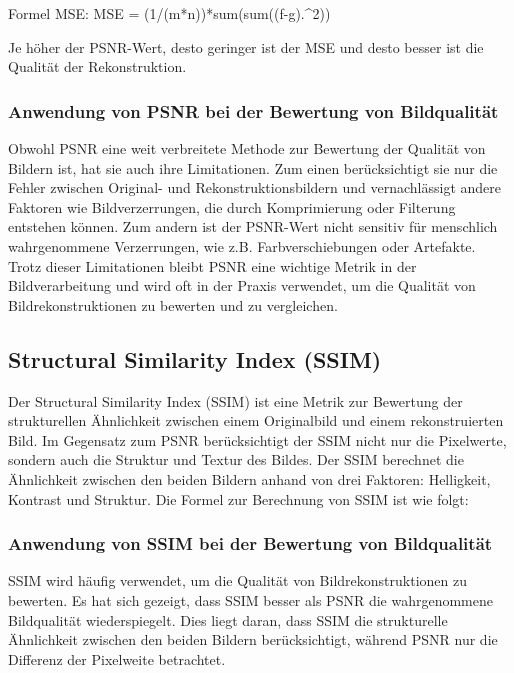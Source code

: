             Formel MSE: MSE = (1/(m*n))*sum(sum((f-g).^2))

            
            Je höher der PSNR-Wert, desto geringer ist der MSE und desto besser ist die Qualität der Rekonstruktion.
        \subsubsection{Anwendung von PSNR bei der Bewertung von Bildqualität}
            Obwohl PSNR eine weit verbreitete Methode zur Bewertung der Qualität von Bildern ist, hat sie auch ihre Limitationen.
            Zum einen berücksichtigt sie nur die Fehler zwischen Original- und Rekonstruktionsbildern und vernachlässigt andere Faktoren wie Bildverzerrungen, die durch Komprimierung oder Filterung entstehen können.
            Zum andern ist der PSNR-Wert nicht sensitiv für menschlich wahrgenommene Verzerrungen, wie z.B. Farbverschiebungen oder Artefakte.
            Trotz dieser Limitationen bleibt PSNR eine wichtige Metrik in der Bildverarbeitung und wird oft in der Praxis verwendet, um die Qualität von Bildrekonstruktionen zu bewerten und zu vergleichen.
    \subsection{Structural Similarity Index (SSIM)}

        Der Structural Similarity Index (SSIM) ist eine Metrik zur Bewertung der strukturellen Ähnlichkeit zwischen einem Originalbild und einem rekonstruierten Bild. 
        Im Gegensatz zum PSNR berücksichtigt der SSIM nicht nur die Pixelwerte, sondern auch die Struktur und Textur des Bildes. 
        Der SSIM berechnet die Ähnlichkeit zwischen den beiden Bildern anhand von drei Faktoren: Helligkeit, Kontrast und Struktur. Die Formel zur Berechnung von SSIM ist wie folgt:
        \begin{equation}
        \end{equation}
        \subsubsection{Anwendung von SSIM bei der Bewertung von Bildqualität}
        
            SSIM wird häufig verwendet, um die Qualität von Bildrekonstruktionen zu bewerten. Es hat sich gezeigt, dass SSIM besser als PSNR die wahrgenommene Bildqualität wiederspiegelt. 
            Dies liegt daran, dass SSIM die strukturelle Ähnlichkeit zwischen den beiden Bildern berücksichtigt, während PSNR nur die Differenz der Pixelweite betrachtet.
